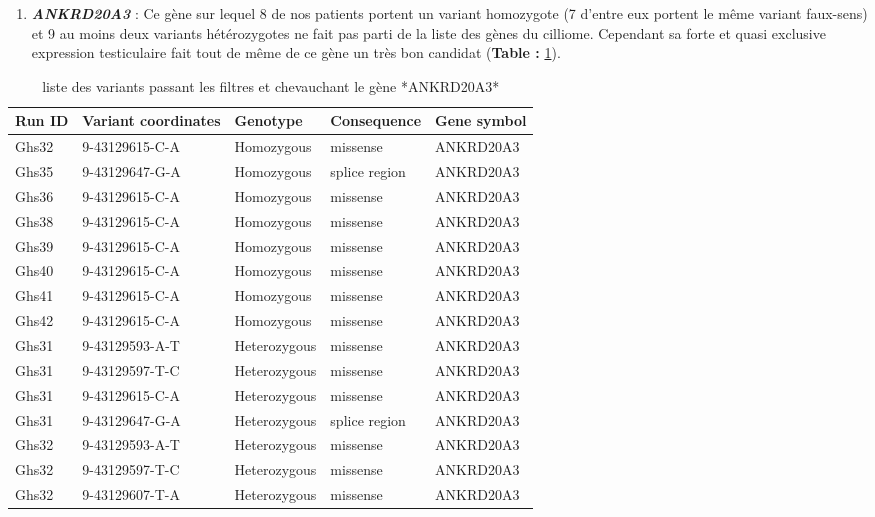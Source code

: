 \documentclass[12pt,twoside]{reedthesis}
\providecommand{\tightlist}{%
  \setlength{\itemsep}{0pt}\setlength{\parskip}{0pt}}
\theoremstyle{definition}
\theoremstyle{definition}
\theoremstyle{remark}
\begin{document}
  \begin{enumerate}
  \def\labelenumi{\arabic{enumi}.}
  \setcounter{enumi}{4}
  \tightlist
  \item
    \textbf{\emph{ANKRD20A3}} : Ce gène sur lequel 8 de nos patients
    portent un variant homozygote (7 d'entre eux portent le même variant
    faux-sens) et 9 au moins deux variants hétérozygotes ne fait pas parti
    de la liste des gènes du cilliome. Cependant sa forte et quasi
    exclusive expression testiculaire fait tout de même de ce gène un très
    bon candidat (\textbf{Table : }\ref{tab:tabankrd20a3}).
  \end{enumerate}
  
  \begin{longtable}[t]{lllll}
  \caption{\label{tab:tabankrd20a3}liste des variants passant les filtres et chevauchant le gène *ANKRD20A3*}\\
  \toprule
  Run ID & Variant coordinates & Genotype & Consequence & Gene symbol\\
  \midrule
  Ghs32 & 9-43129615-C-A & Homozygous & missense & ANKRD20A3\\
  Ghs35 & 9-43129647-G-A & Homozygous & splice region & ANKRD20A3\\
  Ghs36 & 9-43129615-C-A & Homozygous & missense & ANKRD20A3\\
  Ghs38 & 9-43129615-C-A & Homozygous & missense & ANKRD20A3\\
  Ghs39 & 9-43129615-C-A & Homozygous & missense & ANKRD20A3\\
  \addlinespace
  Ghs40 & 9-43129615-C-A & Homozygous & missense & ANKRD20A3\\
  Ghs41 & 9-43129615-C-A & Homozygous & missense & ANKRD20A3\\
  Ghs42 & 9-43129615-C-A & Homozygous & missense & ANKRD20A3\\
  Ghs31 & 9-43129593-A-T & Heterozygous & missense & ANKRD20A3\\
  Ghs31 & 9-43129597-T-C & Heterozygous & missense & ANKRD20A3\\
  \addlinespace
  Ghs31 & 9-43129615-C-A & Heterozygous & missense & ANKRD20A3\\
  Ghs31 & 9-43129647-G-A & Heterozygous & splice region & ANKRD20A3\\
  Ghs32 & 9-43129593-A-T & Heterozygous & missense & ANKRD20A3\\
  Ghs32 & 9-43129597-T-C & Heterozygous & missense & ANKRD20A3\\
  Ghs32 & 9-43129607-T-A & Heterozygous & missense & ANKRD20A3\\

\end{longtable}
\end{document}
